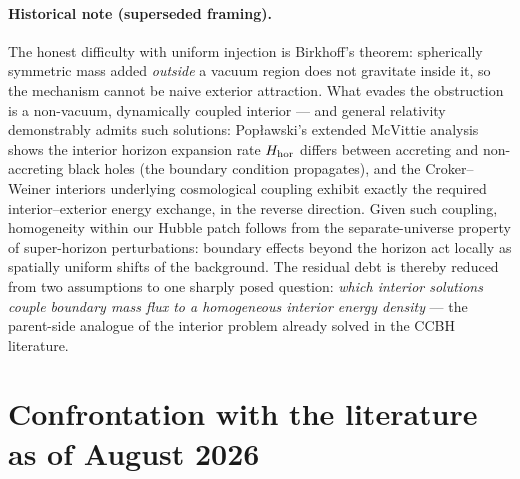 \documentclass[11pt]{article}
\begin{document}
\paragraph{Historical note (superseded framing).} The honest difficulty with uniform injection is Birkhoff's theorem: spherically symmetric mass added \emph{outside} a vacuum region does not gravitate inside it, so the mechanism cannot be naive exterior attraction. What evades the obstruction is a non-vacuum, dynamically coupled interior --- and general relativity demonstrably admits such solutions: Popławski's extended McVittie analysis shows the interior horizon expansion rate $H_{\rm hor}$ differs between accreting and non-accreting black holes \cite{Poplawski2024} (the boundary condition propagates), and the Croker--Weiner interiors underlying cosmological coupling \cite{CrokerWeiner2019} exhibit exactly the required interior--exterior energy exchange, in the reverse direction. Given such coupling, homogeneity within our Hubble patch follows from the separate-universe property of super-horizon perturbations: boundary effects beyond the horizon act locally as spatially uniform shifts of the background. The residual debt is thereby reduced from two assumptions to one sharply posed question: \emph{which interior solutions couple boundary mass flux to a homogeneous interior energy density} --- the parent-side analogue of the interior problem already solved in the CCBH literature.

\section{Confrontation with the literature as of August 2026}
\end{document}
